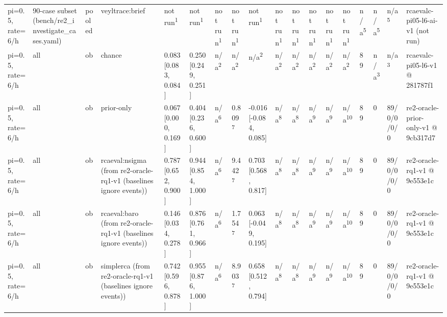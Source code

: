 \begin{table}[t]
\begin{tabular}{llllllllllllllllll}
pi=0.5, rate=6/h & 90-case subset (bench/re2\_investigate\_cases.yaml) & pooled & veyltrace:brief & not run\textsuperscript{1} & not run\textsuperscript{1} & not run\textsuperscript{1} & not run\textsuperscript{1} & not run\textsuperscript{1} & not run\textsuperscript{1} & not run\textsuperscript{1} & not run\textsuperscript{1} & not run\textsuperscript{1} & not run\textsuperscript{1} & n/a\textsuperscript{5} & n/a\textsuperscript{5} & n/a\textsuperscript{5} & rcaevalc-pi05-l6-ai-v1 (not run) \\
pi=0.5, rate=6/h & all & ob & chance & 0.083 [0.083, 0.084] & 0.250 [0.249, 0.251] & n/a\textsuperscript{2} & n/a\textsuperscript{2} & n/a\textsuperscript{2} & n/a\textsuperscript{2} & n/a\textsuperscript{2} & n/a\textsuperscript{2} & n/a\textsuperscript{2} & n/a\textsuperscript{2} & 89 & n/a\textsuperscript{3} & n/a\textsuperscript{3} & rcaevalc-pi05-l6-v1 @ 281787f1 \\
pi=0.5, rate=6/h & all & ob & prior-only & 0.067 [0.000, 0.169] & 0.404 [0.236, 0.600] & n/a\textsuperscript{6} & 0.809\textsuperscript{7} & -0.016 [-0.084, 0.085] & n/a\textsuperscript{8} & n/a\textsuperscript{8} & n/a\textsuperscript{9} & n/a\textsuperscript{9} & n/a\textsuperscript{10} & 89 & 0 & 89/0/0/0/0 & re2-oracle-prior-only-v1 @ 9cb317d7 \\
pi=0.5, rate=6/h & all & ob & rcaeval:nsigma (from re2-oracle-rq1-v1 (baselines ignore events)) & 0.787 [0.652, 0.900] & 0.944 [0.854, 1.000] & n/a\textsuperscript{6} & 9.442\textsuperscript{7} & 0.703 [0.568, 0.817] & n/a\textsuperscript{8} & n/a\textsuperscript{8} & n/a\textsuperscript{9} & n/a\textsuperscript{9} & n/a\textsuperscript{10} & 89 & 0 & 89/0/0/0/0 & re2-oracle-rq1-v1 @ 9e553e1c \\
pi=0.5, rate=6/h & all & ob & rcaeval:baro (from re2-oracle-rq1-v1 (baselines ignore events)) & 0.146 [0.034, 0.278] & 0.876 [0.761, 0.966] & n/a\textsuperscript{6} & 1.754\textsuperscript{7} & 0.063 [-0.049, 0.195] & n/a\textsuperscript{8} & n/a\textsuperscript{8} & n/a\textsuperscript{9} & n/a\textsuperscript{9} & n/a\textsuperscript{10} & 89 & 0 & 89/0/0/0/0 & re2-oracle-rq1-v1 @ 9e553e1c \\
pi=0.5, rate=6/h & all & ob & simplerca (from re2-oracle-rq1-v1 (baselines ignore events)) & 0.742 [0.596, 0.878] & 0.955 [0.876, 1.000] & n/a\textsuperscript{6} & 8.903\textsuperscript{7} & 0.658 [0.512, 0.794] & n/a\textsuperscript{8} & n/a\textsuperscript{8} & n/a\textsuperscript{9} & n/a\textsuperscript{9} & n/a\textsuperscript{10} & 89 & 0 & 89/0/0/0/0 & re2-oracle-rq1-v1 @ 9e553e1c \\

\end{tabular}
\end{table}
